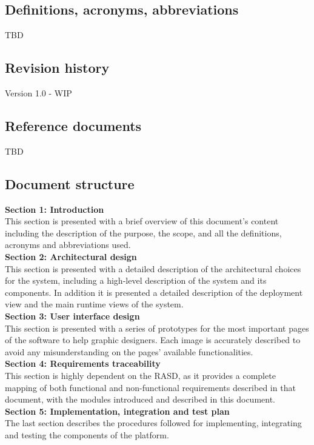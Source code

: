 \documentclass[11pt,twoside]{article}
\begin{document}
	\subsection{Definitions, acronyms, abbreviations}
TBD

	\subsection{Revision history}
Version 1.0 - WIP

	\subsection{Reference documents}
TBD

	\subsection{Document structure}
\textbf{Section 1: Introduction} \\
This section is presented with a brief overview of this document's content including the description of the purpose, the scope, and all the definitions, acronyms and abbreviations used.
\vspace{1\baselineskip} \\
\textbf{Section 2: Architectural design} \\
This section is presented with a detailed description of the architectural choices for the system, including a high-level description of the system and its components. In addition it is presented a detailed description of the deployment view and the main runtime views of the system.
\vspace{1\baselineskip} \\
\textbf{Section 3: User interface design} \\
This section is presented with a series of prototypes for the most important pages of the software to help graphic designers. Each image is accurately described to avoid any misunderstanding on the pages' available functionalities.
\vspace{1\baselineskip} \\
\textbf{Section 4: Requirements traceability} \\
This section is highly dependent on the RASD, as it provides a complete mapping of both functional and non-functional requirements described in that document, with the modules introduced and described in this document.
\vspace{1\baselineskip} \\
\textbf{Section 5: Implementation, integration and test plan} \\
The last section describes the procedures followed for implementing, integrating and testing the components of the platform.
\end{document}
